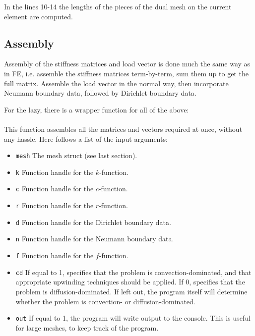 In the lines 10-14 the lengths of the pieces of the dual mesh on the current element are computed. 



\subsection{Assembly}

Assembly of the stiffness matrices and load vector is done much the same way
as in FE, i.e. assemble the stiffness matrices term-by-term, sum them up to get
the full matrix. Assemble the load vector in the normal way, then incorporate
Neumann boundary data, followed by Dirichlet boundary data.

For the lazy, there is a wrapper function for all of the above: \\

  \\

This function assembles all the matrices and vectors required at once, without
any hassle. Here follows a list of the input arguments:

\begin{itemize}
\item {\tt mesh} The mesh struct (see last section).
\item {\tt k} Function handle for the $k$-function.
\item {\tt c} Function handle for the $c$-function.
\item {\tt r} Function handle for the $r$-function.
\item {\tt d} Function handle for the Dirichlet boundary data.
\item {\tt n} Function handle for the Neumann boundary data.
\item {\tt f} Function handle for the $f$-function.
\item {\tt cd} If equal to 1, specifies that the problem is convection-dominated,
and that appropriate upwinding techniques should be applied. If 0, specifies
that the problem is diffusion-dominated. If left out, the program itself will
determine whether the problem is convection- or diffusion-dominated.
\item {\tt out} If equal to 1, the program will write output to the console.
This is useful for large meshes, to keep track of the program.
\end{itemize}

